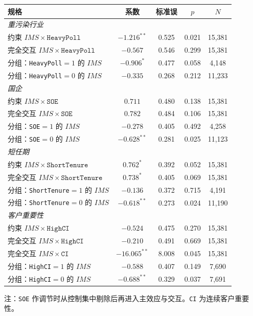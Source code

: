 \documentclass[11pt]{article}
\begin{document}
\begin{center}
\begin{threeparttable}
\caption{文献导向调节：\(IMS\) 交互与分组}
\label{tab:lit}
\begin{tabular}{lcccc}
\toprule
规格 & 系数 & 标准误 & \(p\) & \(N\) \\
\midrule
\multicolumn{5}{l}{\textit{重污染行业}} \\
约束 \(IMS\times\texttt{HeavyPoll}\) & \(-1.216^{**}\) & 0.525 & 0.021 & 15,381 \\
完全交互 \(IMS\times\texttt{HeavyPoll}\) & \(-0.567\) & 0.546 & 0.299 & 15,381 \\
分组：\texttt{HeavyPoll}\(=1\) 的 \(IMS\) & \(-0.906^{*}\) & 0.477 & 0.058 & 4,148 \\
分组：\texttt{HeavyPoll}\(=0\) 的 \(IMS\) & \(-0.335\) & 0.268 & 0.212 & 11,233 \\
\midrule
\multicolumn{5}{l}{\textit{国企}} \\
约束 \(IMS\times\texttt{SOE}\) & \(0.711\) & 0.480 & 0.138 & 15,381 \\
完全交互 \(IMS\times\texttt{SOE}\) & \(0.782\) & 0.484 & 0.106 & 15,381 \\
分组：\texttt{SOE}\(=1\) 的 \(IMS\) & \(-0.278\) & 0.405 & 0.492 & 4,258 \\
分组：\texttt{SOE}\(=0\) 的 \(IMS\) & \(-0.628^{**}\) & 0.281 & 0.025 & 11,123 \\
\midrule
\multicolumn{5}{l}{\textit{短任期}} \\
约束 \(IMS\times\texttt{ShortTenure}\) & \(0.762^{*}\) & 0.392 & 0.052 & 15,381 \\
完全交互 \(IMS\times\texttt{ShortTenure}\) & \(0.738^{*}\) & 0.405 & 0.069 & 15,381 \\
分组：\texttt{ShortTenure}\(=1\) 的 \(IMS\) & \(-0.136\) & 0.372 & 0.715 & 4,191 \\
分组：\texttt{ShortTenure}\(=0\) 的 \(IMS\) & \(-0.618^{**}\) & 0.273 & 0.024 & 11,190 \\
\midrule
\multicolumn{5}{l}{\textit{客户重要性}} \\
约束 \(IMS\times\texttt{HighCI}\) & \(-0.524\) & 0.475 & 0.270 & 15,381 \\
完全交互 \(IMS\times\texttt{HighCI}\) & \(-0.210\) & 0.491 & 0.669 & 15,381 \\
完全交互 \(IMS\times\texttt{CI}\) & \(-16.065^{**}\) & 8.008 & 0.045 & 15,381 \\
分组：\texttt{HighCI}\(=1\) 的 \(IMS\) & \(-0.588\) & 0.407 & 0.149 & 7,690 \\
分组：\texttt{HighCI}\(=0\) 的 \(IMS\) & \(-0.688^{**}\) & 0.329 & 0.037 & 7,691 \\
\bottomrule
\end{tabular}
\begin{tablenotes}\footnotesize
\item 注：\texttt{SOE} 作调节时从控制集中剔除后再进入主效应与交互。\texttt{CI} 为连续客户重要性。
\end{tablenotes}
\end{threeparttable}
\end{center}
\end{document}
